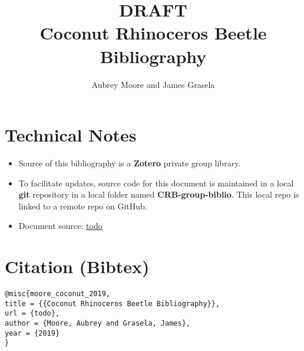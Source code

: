\documentclass[12pt,letterpaper,english]{scrartcl}
\title{DRAFT \\ Coconut Rhinoceros Beetle Bibliography}
\author{Aubrey Moore and James Grasela}
\begin{document}
\maketitle

\printbibliography

\nocite{*}

\section*{Technical Notes}

\begin{itemize}
	\item Source of this bibliography is a \textbf{Zotero} private group library. 
	\item To facilitate updates, source code for this document is maintained in a local \textbf{git} repository in a local folder named \textbf{CRB-group-biblio}. This local repo is linked to a remote repo on GitHub. 
	\item Document source: \url{todo}
\end{itemize}

\section*{Citation (Bibtex)}

\begin{verbatim}
@misc{moore_coconut_2019,
title = {{Coconut Rhinoceros Beetle Bibliography}},
url = {todo},
author = {Moore, Aubrey and Grasela, James},
year = {2019}
}
\end{verbatim}
\end{document}
